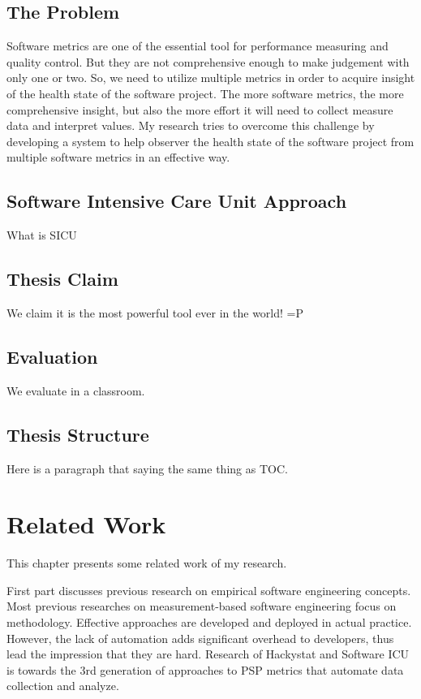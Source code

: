 \section{The Problem}
Software metrics are one of the essential tool for performance measuring and quality control. But they are not comprehensive enough to make judgement with only one or two. So, we need to utilize multiple metrics in order to acquire insight of the health state of the software project. The more software metrics, the more comprehensive insight, but also the more effort it will need to collect measure data and interpret values. My research tries to overcome this challenge by developing a system to help observer the health state of the software project from multiple software metrics in an effective way.

\section{Software Intensive Care Unit Approach}
What is SICU

\section{Thesis Claim}
We claim it is the most powerful tool ever in the world! =P

\section{Evaluation}
We evaluate in a classroom.

\section{Thesis Structure}
Here is a paragraph that saying the same thing as TOC.

\chapter{Related Work}
This chapter presents some related work of my research.

First part discusses previous research on empirical software engineering concepts. Most previous researches on measurement-based software engineering focus on methodology. Effective approaches are developed and deployed in actual practice. However, the lack of automation adds significant overhead to developers, thus lead the impression that they are hard. Research of Hackystat and Software ICU is towards the 3rd generation of approaches to PSP metrics that automate data collection and analyze\cite{csdl2-02-07}.


